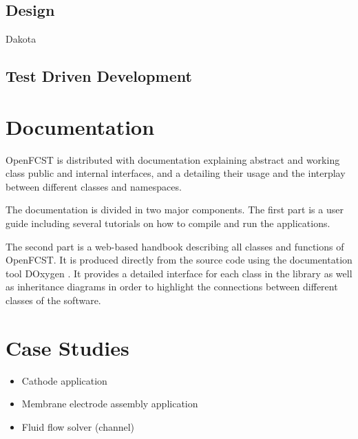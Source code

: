 \documentclass[]{elsart}
\begin{document}
\subsection{Design}

Dakota

\subsection{Test Driven Development}



\section{Documentation} \label{sec:Documentation}

OpenFCST is distributed with documentation explaining abstract and working class public and internal interfaces, and a detailing their usage and the interplay between different classes and namespaces.

The documentation is divided in two major components. The first part is a user guide including several tutorials on how to compile and run the applications. 

The second part is a web-based handbook describing all classes and functions of OpenFCST. It is produced directly from the source code using the documentation tool DOxygen \cite{}. It provides a detailed interface for each class in the library as well as inheritance diagrams in order to highlight the connections between different classes of the software. 

\section{Case Studies} \label{sec:Case_studies}

\begin{itemize}
 \item Cathode application
 \item Membrane electrode assembly application
 \item Fluid flow solver (channel)
\end{itemize}
\end{document}
